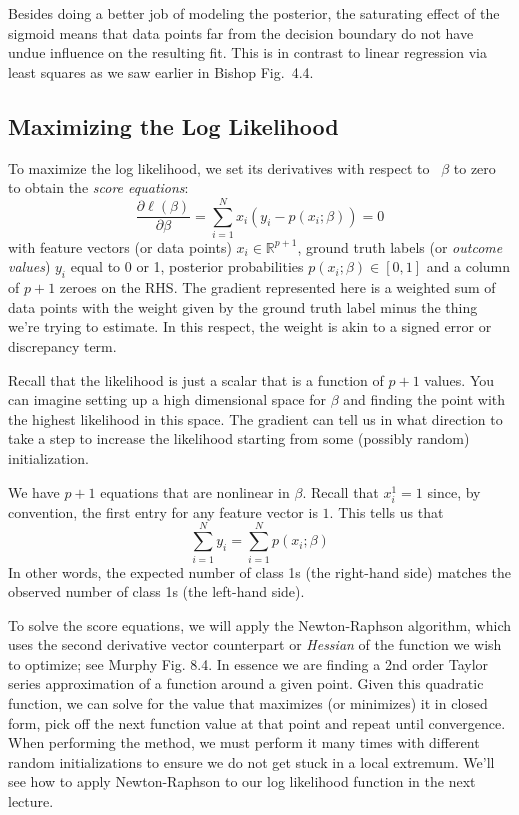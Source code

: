 \documentclass[a4paper]{article}
\begin{document}
Besides doing a better job of modeling the posterior, the saturating effect of the sigmoid means that data points far from the decision boundary do not have undue influence on the resulting fit.  This is in contrast to linear regression via least squares as we saw earlier in Bishop Fig.\ 4.4.


\subsection{Maximizing the Log Likelihood}

To maximize the log likelihood, we set its derivatives with respect to  \ $\beta$ to zero to obtain the \emph{score equations}:
$$
\frac{\partial \ell(\beta)}{\partial \beta} = \sum_{i=1}^N x_i \left(y_i - p(x_i;\beta)\right) = 0
$$
with feature vectors (or data points) $x_i\in\mathbb{R}^{p+1}$, ground truth labels (or \emph{outcome values}) $y_i$ equal to 0 or 1, posterior probabilities $p(x_i;\beta)\in [0,1]$ and a column of $p+1$ zeroes on the RHS.  The gradient represented here is a weighted sum of data points with the weight given by the ground truth label minus the thing we're trying to estimate.  In this respect, the weight is akin to a signed error or discrepancy term.

Recall that the likelihood is just a scalar that is a function of $p+1$ values. You can imagine setting up a high dimensional space for $\beta$ and finding the point with the highest likelihood in this space.  The gradient can tell us in what direction to take a step to increase the likelihood starting from some (possibly random) initialization.

We have $p+1$ equations that are nonlinear in $\beta$. Recall that 
$x_i^1 = 1$ since, by convention, the first entry for any feature vector is $1$. This tells us that 
$$\sum_{i=1}^{N} y_i = \sum_{i=1}^{N} p(x_i;\beta)$$ 
In other words, the expected number of class 1s (the right-hand side) matches the observed number of class 1s (the left-hand side).

To solve the score equations, we will apply the Newton-Raphson algorithm, which uses the second derivative vector counterpart or \emph{Hessian} of the function we wish to optimize; see Murphy Fig. 8.4.  In essence we are finding a 2nd order Taylor series approximation of a function around a given point.  Given this quadratic function, we can solve for the value that maximizes (or minimizes) it in closed form, pick off the next function value at that point and repeat until convergence. When performing the method, we must perform it many times with different random initializations to ensure we do not get stuck in a local extremum. We'll see how to apply Newton-Raphson to our log likelihood function in the next lecture.
\end{document}
